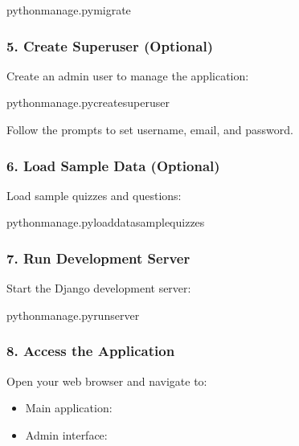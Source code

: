 \documentclass[letterpaper,10pt,english]{sphinxmanual}
\begin{document}
\begin{sphinxVerbatim}[commandchars=\\\{\}]
pythonmanage.pymigrate
\end{sphinxVerbatim}


\subsubsection{5. Create Superuser (Optional)}
\label{\detokenize{installation:create-superuser-optional}}
\sphinxAtStartPar
Create an admin user to manage the application:

\begin{sphinxVerbatim}[commandchars=\\\{\}]
pythonmanage.pycreatesuperuser
\end{sphinxVerbatim}

\sphinxAtStartPar
Follow the prompts to set username, email, and password.


\subsubsection{6. Load Sample Data (Optional)}
\label{\detokenize{installation:load-sample-data-optional}}
\sphinxAtStartPar
Load sample quizzes and questions:

\begin{sphinxVerbatim}[commandchars=\\\{\}]
pythonmanage.pyloaddatasample\PYGZus{}quizzes
\end{sphinxVerbatim}


\subsubsection{7. Run Development Server}
\label{\detokenize{installation:run-development-server}}
\sphinxAtStartPar
Start the Django development server:

\begin{sphinxVerbatim}[commandchars=\\\{\}]
pythonmanage.pyrunserver
\end{sphinxVerbatim}


\subsubsection{8. Access the Application}
\label{\detokenize{installation:access-the-application}}
\sphinxAtStartPar
Open your web browser and navigate to:
\begin{itemize}
\item {} 
\sphinxAtStartPar
Main application: 

\item {} 
\sphinxAtStartPar
Admin interface: 

\end{itemize}
\end{document}
